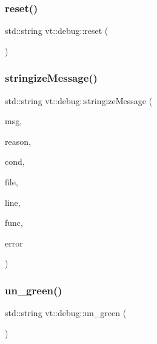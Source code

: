 \subsubsection{\texorpdfstring{reset()}{reset()}}
{\footnotesize\ttfamily std\+::string vt\+::debug\+::reset (\begin{DoxyParamCaption}{ }\end{DoxyParamCaption})\hspace{0.3cm}{\ttfamily [inline]}}

\mbox{\label{namespacevt_1_1debug_a63b47ef166cce2fe27d4fbc366a2e23c}} 
\subsubsection{\texorpdfstring{stringize\+Message()}{stringizeMessage()}}
{\footnotesize\ttfamily std\+::string vt\+::debug\+::stringize\+Message (\begin{DoxyParamCaption}\item[{std\+::string const \&}]{msg,  }\item[{std\+::string const \&}]{reason,  }\item[{std\+::string const \&}]{cond,  }\item[{std\+::string const \&}]{file,  }\item[{int const}]{line,  }\item[{std\+::string const \&}]{func,  }\item[{\hyperlink{namespacevt_a793764d753923abc3d32929870beb485}{Error\+Code\+Type}}]{error }\end{DoxyParamCaption})}

\mbox{\label{namespacevt_1_1debug_aa449a2c29c030d8cd267fd19c0511d5c}} 
\subsubsection{\texorpdfstring{un\+\_\+green()}{un\_green()}}
{\footnotesize\ttfamily std\+::string vt\+::debug\+::un\+\_\+green (\begin{DoxyParamCaption}{ }\end{DoxyParamCaption})\hspace{0.3cm}{\ttfamily [inline]}}

